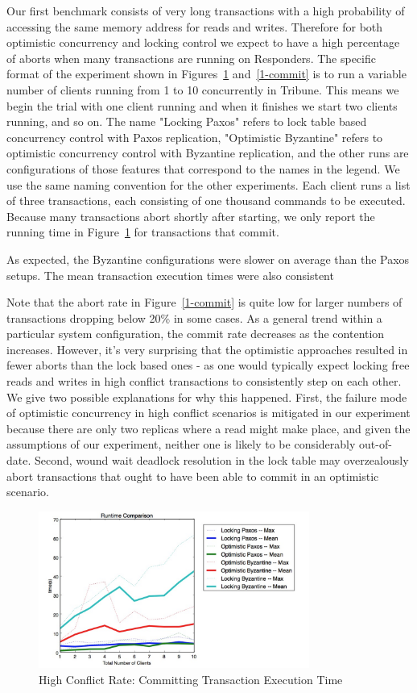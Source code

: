 \documentclass[10pt,twocolumn]{article}
\begin{document}
Our first benchmark consists of very long transactions with a high probability of accessing the same memory address for reads and writes. Therefore for both optimistic concurrency and locking control we expect to have a high percentage of aborts when many transactions are running on Responders. The specific format of the experiment shown in Figures~\ref{1-time} and~\ref{1-commit} is to run a variable number of clients running from 1 to 10 concurrently in Tribune. This means we begin the trial with one client running and when it finishes we start two clients running, and so on. The name "Locking Paxos" refers to lock table based concurrency control with Paxos replication, "Optimistic Byzantine" refers to optimistic concurrency control with Byzantine replication, and the other runs are configurations of those features that correspond to the names in the legend. We use the same naming convention for the other experiments. Each client runs a list of three transactions, each consisting of one thousand commands to be executed. Because many transactions abort shortly after starting, we only report the running time in Figure~\ref{1-time} for transactions that commit.

As expected, the Byzantine configurations were slower on average than the Paxos setups. The mean transaction execution times were also consistent 

Note that the abort rate in Figure~\ref{1-commit} is quite low for larger numbers of transactions dropping below 20\% in some cases. As a general trend within a particular system configuration, the commit rate decreases as the contention increases. However, it's very surprising that the optimistic approaches resulted in fewer aborts than the lock based ones - as one would typically expect locking free reads and writes in high conflict transactions to consistently step on each other. We give two possible explanations for why this happened. First, the failure mode of optimistic concurrency in high conflict scenarios is mitigated in our experiment because there are only two replicas where a read might make place, and given the assumptions of our experiment, neither one is likely to be considerably out-of-date. Second, wound wait deadlock resolution in the lock table may overzealously abort transactions that ought to have been able to commit in an optimistic scenario.

\begin{figure}[!b]
  \begin{center}
    \includegraphics[width=3.5in]{Images/1-time.png}
  \end{center}

  \caption{\small High Conflict Rate: Committing Transaction Execution Time }
  \label{1-time}
\end{figure}
\end{document}
